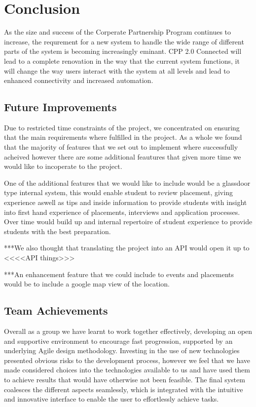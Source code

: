 \section{Conclusion}
As the size and success of the Corperate Partnership Program continues to increase, the requrement for a new system to handle the wide range of different parts of the system is becoming increasingly eminant. CPP 2.0 Connected will lead to a complete renovation in the way that the current system functions, it will change the way users interact with the system at all levels and lead to enhanced connectivity and increased automation.
	
	\subsection{Future Improvements}
		Due to restricted time constraints of the project, we concentrated on ensuring that the main requirements where fulfilled in the project. As a whole we found that the majority of features that we set out to implement where successfully acheived however there are some additional feautures that given more time we would like to incoperate to the project.

		One of the additional features that we would like to include would be a glassdoor type internal system, this would enable student to review placement, giving experience aswell as tips and inside information to provide students with insight into first hand experience of placements, interviews and application processes. Over time would build up and internal repertoire of student experience to provide students with the best preparation.

		***We also thought that translating the project into an API would open it up to <<<<API things>>>
		
		***An enhancement feature that we could include to events and placements would be to include a google map view of the location.

	\subsection{Team Achievements}
		Overall as a group we have learnt to work together effectively, developing an open and supportive environment to encourage fast progression, supported by an underlying Agile design methodology.
		Investing in the use of new technologies presented obvious risks to the development process, however we feel that we have made considered choices into the technologies available to us and have used them to achieve results that would have otherwise not been feasible. The final system coalesces the different aspects seamlessly, which is integrated with the intuitive and innovative interface to enable the user to effortlessly achieve tasks.
		
